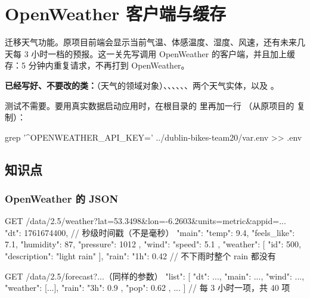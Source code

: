 \chapter{OpenWeather 客户端与缓存}

迁移天气功能。原项目前端会显示当前气温、体感温度、湿度、风速，还有未来几天每 3 小时一档的预报。这一关先写调用 OpenWeather 的客户端，并且加上缓存：5 分钟内重复请求，不再打到 OpenWeather。


\textbf{已经写好、不要改的类：}（天气的领域对象）、、、、、、两个天气实体，以及 。

\begin{note}
测试不需要。要用真实数据启动应用时，在根目录的  里再加一行 （从原项目的  复制）：
\begin{shell}
grep '^OPENWEATHER_API_KEY=' ../dublin-bikes-team20/var.env >> .env
\end{shell}
\end{note}

\section{知识点}

\subsection{OpenWeather 的 JSON}

\begin{jsoncode}
GET /data/2.5/weather?lat=53.3498&lon=-6.2603&units=metric&appid=...
{
  "dt": 1761674400,                                    // 秒级时间戳（不是毫秒）
  "main": { "temp": 9.4, "feels_like": 7.1, "humidity": 87, "pressure": 1012 },
  "wind": { "speed": 5.1 },
  "weather": [ { "id": 500, "description": "light rain" } ],
  "rain": { "1h": 0.42 }                               // 不下雨时整个 rain 都没有
}

GET /data/2.5/forecast?...（同样的参数）
{ "list": [ { "dt": ..., "main": {...}, "wind": {...}, "weather": [...],
              "rain": { "3h": 0.9 }, "pop": 0.62 }, ... ] }   // 每 3 小时一项，共 40 项
\end{jsoncode}

